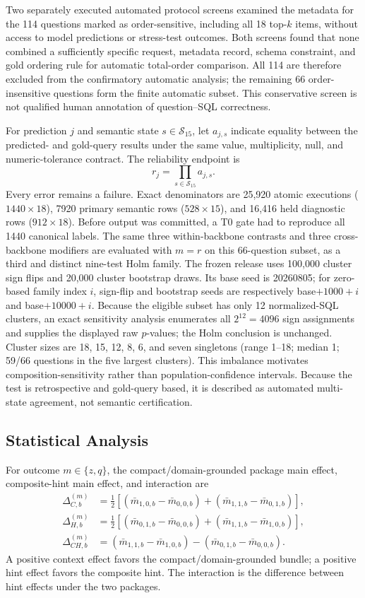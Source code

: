 \documentclass[applsci,article,submit,moreauthors]{Definitions/mdpi}
\begin{document}
Two separately executed automated protocol screens examined the metadata for the 114 questions marked as order-sensitive, including all 18 top-$k$ items, without access to model predictions or stress-test outcomes. Both screens found that none combined a sufficiently specific request, metadata record, schema constraint, and gold ordering rule for automatic total-order comparison. All 114 are therefore excluded from the confirmatory automatic analysis; the remaining 66 order-insensitive questions form the finite automatic subset. This conservative screen is not qualified human annotation of question--SQL correctness.

For prediction $j$ and semantic state $s\in\mathcal{S}_{15}$, let $a_{j,s}$ indicate equality between the predicted- and gold-query results under the same value, multiplicity, null, and numeric-tolerance contract. The reliability endpoint is
\begin{equation}
r_j=\prod_{s\in\mathcal{S}_{15}} a_{j,s}.
\end{equation}
Every error remains a failure. Exact denominators are 25,920 atomic executions ($1440\times18$), 7920 primary semantic rows ($528\times15$), and 16,416 held diagnostic rows ($912\times18$). Before output was committed, a T0 gate had to reproduce all 1440 canonical labels. The same three within-backbone contrasts and three cross-backbone modifiers are evaluated with $m=r$ on this 66-question subset, as a third and distinct nine-test Holm family. The frozen release uses 100,000 cluster sign flips and 20,000 cluster bootstrap draws. Its base seed is 20260805; for zero-based family index $i$, sign-flip and bootstrap seeds are respectively base$+1000+i$ and base$+10000+i$. Because the eligible subset has only 12 normalized-SQL clusters, an exact sensitivity analysis enumerates all $2^{12}=4096$ sign assignments and supplies the displayed raw $p$-values; the Holm conclusion is unchanged. Cluster sizes are 18, 15, 12, 8, 6, and seven singletons (range 1--18; median 1; 59/66 questions in the five largest clusters). This imbalance motivates composition-sensitivity rather than population-confidence intervals. Because the test is retrospective and gold-query based, it is described as automated multi-state agreement, not semantic certification.

\subsection{Statistical Analysis}
For outcome $m\in\{z,q\}$, the compact/domain-grounded package main effect, composite-hint main effect, and interaction are
\begin{align}
\Delta_{C,b}^{(m)}&=\tfrac12[(\bar m_{1,0,b}-\bar m_{0,0,b})+
(\bar m_{1,1,b}-\bar m_{0,1,b})],\\
\Delta_{H,b}^{(m)}&=\tfrac12[(\bar m_{0,1,b}-\bar m_{0,0,b})+
(\bar m_{1,1,b}-\bar m_{1,0,b})],\\
\Delta_{CH,b}^{(m)}&=(\bar m_{1,1,b}-\bar m_{1,0,b})-
(\bar m_{0,1,b}-\bar m_{0,0,b}).
\end{align}
A positive context effect favors the compact/domain-grounded bundle; a positive hint effect favors the composite hint. The interaction is the difference between hint effects under the two packages.
\end{document}
